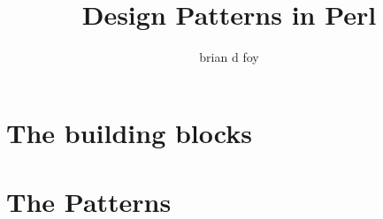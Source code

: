 \documentclass[10pt]{book}
\title{Design Patterns in Perl}
\author{brian d foy}
\begin{document}
\frontmatter

\maketitle

\pagestyle{headings}

\tableofcontents

	
	
\mainmatter

\part{The building blocks}

	

	
	
	
	
	
	
\part{The Patterns}

	

	

	
	
	

	

	

	

	

	

	

	

\appendix

	
	        
	
	
\backmatter
\end{document}
